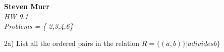 \documentclass{article}
\begin{document}
\setcounter{totalnumber}{5}
   \begin{flushright}
      \Large\textbf{Steven Murr}\\
      \large\textit{HW 9.1} \\
      \large\textit{ Problems = \{ 2,3,4,6\}}
   \end{flushright}
\begin{flushleft}
\makeatletter%
\setlength{\@fptop}{5pt}
\makeatother

\setlength\parindent{0pt}2a) List all the ordered pairs in the relation $R = \{(a,b)\} | a divides b\}$

\end{flushleft}
\end{document}
